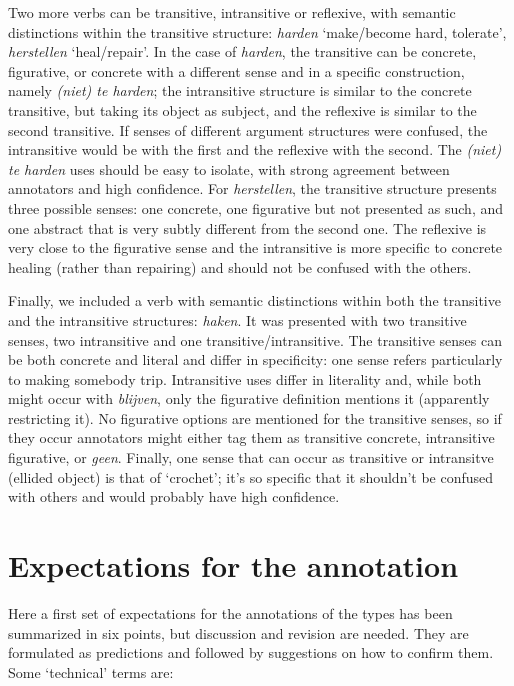 \documentclass[
]{book}
\begin{document}
Two more verbs can be transitive, intransitive or reflexive, with semantic distinctions within the transitive structure: \emph{harden} `make/become hard, tolerate', \emph{herstellen} `heal/repair'.
In the case of \emph{harden}, the transitive can be concrete, figurative, or concrete with a different sense and in a specific construction, namely \emph{(niet) te harden}; the intransitive structure is similar to the concrete transitive, but taking its object as subject, and the reflexive is similar to the second transitive. If senses of different argument structures were confused, the intransitive would be with the first and the reflexive with the second. The \emph{(niet) te harden} uses should be easy to isolate, with strong agreement between annotators and high confidence.
For \emph{herstellen}, the transitive structure presents three possible senses: one concrete, one figurative but not presented as such, and one abstract that is very subtly different from the second one. The reflexive is very close to the figurative sense and the intransitive is more specific to concrete healing (rather than repairing) and should not be confused with the others.

Finally, we included a verb with semantic distinctions within both the transitive and the intransitive structures: \emph{haken}.
It was presented with two transitive senses, two intransitive and one transitive/intransitive. The transitive senses can be both concrete and literal and differ in specificity: one sense refers particularly to making somebody trip. Intransitive uses differ in literality and, while both might occur with \emph{blijven}, only the figurative definition mentions it (apparently restricting it). No figurative options are mentioned for the transitive senses, so if they occur annotators might either tag them as transitive concrete, intransitive figurative, or \emph{geen}. Finally, one sense that can occur as transitive or intransitve (ellided object) is that of `crochet'; it's so specific that it shouldn't be confused with others and would probably have high confidence.

\hypertarget{expectations-for-the-annotation}{%
\section{Expectations for the annotation}\label{expectations-for-the-annotation}}

Here a first set of expectations for the annotations of the types has been summarized in six points, but discussion and revision are needed. They are formulated as predictions and followed by suggestions on how to confirm them. Some `technical' terms are:
\end{document}
